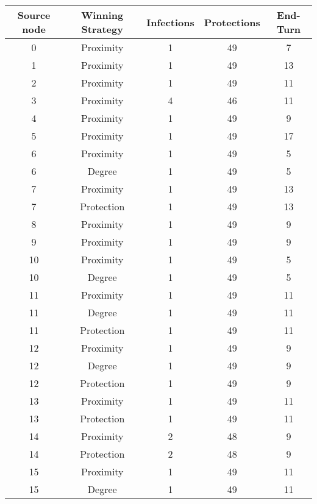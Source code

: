 \documentclass[results.tex]{subfiles}
\begin{document}
\begin{center}
  \begin{tabular}{| c || c | c | c | c |}
    \hline
    {\bfseries Source node} & {\bfseries Winning Strategy} & {\bfseries Infections} & {\bfseries Protections} & {\bfseries End-Turn} \\  %
    \hline\hline
    0 & Proximity & 1 & 49 & 7 \\ 
    \hline
    1 & Proximity & 1 & 49 & 13 \\ 
    \hline
    2 & Proximity & 1 & 49 & 11 \\ 
    \hline
    3 & Proximity & 4 & 46 & 11 \\ 
    \hline
    4 & Proximity & 1 & 49 & 9 \\ 
    \hline
    5 & Proximity & 1 & 49 & 17 \\ 
    \hline
    6 & Proximity & 1 & 49 & 5 \\ 
    \hline
    6 & Degree & 1 & 49 & 5 \\ 
    \hline
    7 & Proximity & 1 & 49 & 13 \\ 
    \hline
    7 & Protection & 1 & 49 & 13 \\ 
    \hline
    8 & Proximity & 1 & 49 & 9 \\ 
    \hline
    9 & Proximity & 1 & 49 & 9 \\ 
    \hline
    10 & Proximity & 1 & 49 & 5 \\ 
    \hline
    10 & Degree & 1 & 49 & 5 \\ 
    \hline
    11 & Proximity & 1 & 49 & 11 \\ 
    \hline
    11 & Degree & 1 & 49 & 11 \\ 
    \hline
    11 & Protection & 1 & 49 & 11 \\ 
    \hline
    12 & Proximity & 1 & 49 & 9 \\ 
    \hline
    12 & Degree & 1 & 49 & 9 \\ 
    \hline
    12 & Protection & 1 & 49 & 9 \\ 
    \hline
    13 & Proximity & 1 & 49 & 11 \\ 
    \hline
    13 & Protection & 1 & 49 & 11 \\ 
    \hline
    14 & Proximity & 2 & 48 & 9 \\ 
    \hline
    14 & Protection & 2 & 48 & 9 \\ 
    \hline
    15 & Proximity & 1 & 49 & 11 \\ 
    \hline
    15 & Degree & 1 & 49 & 11 \\ 
    \hline

\end{tabular}
\end{center}
\end{document}
